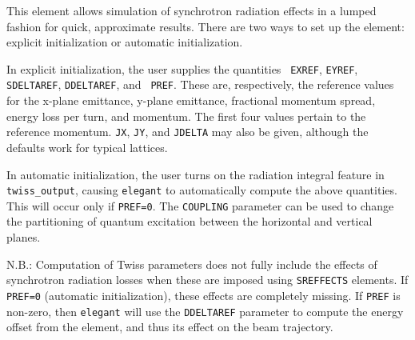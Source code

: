 This element allows simulation of synchrotron radiation effects in a
lumped fashion for quick, approximate results.  There are two ways to
set up the element: explicit initialization or automatic
initialization.  

In explicit initialization, the user supplies the quantities {\tt
EXREF}, {\tt EYREF}, {\tt SDELTAREF}, {\tt DDELTAREF}, and {\tt
PREF}.  These are, respectively, the reference values for the x-plane
emittance, y-plane emittance, fractional momentum spread, energy loss
per turn, and momentum.  The first four values pertain to the
reference momentum.  {\tt JX}, {\tt JY}, and {\tt JDELTA} may also
be given, although the defaults work for typical lattices.

In automatic initialization, the user turns on the radiation integral
feature in {\tt twiss\_output}, causing {\tt elegant} to automatically
compute the above quantities.  This will occur only if {\tt PREF=0}.
The {\tt COUPLING} parameter can be used to change the partitioning of
quantum excitation between the horizontal and vertical planes.

N.B.: Computation of Twiss parameters does not fully include the
effects of synchrotron radiation losses when these are imposed using
{\tt SREFFECTS} elements.  If {\tt PREF=0} (automatic initialization),
these effects are completely missing.  If {\tt PREF} is non-zero, then
{\tt elegant} will use the {\tt DDELTAREF} parameter to compute the
energy offset from the element, and thus its effect on the beam
trajectory.



